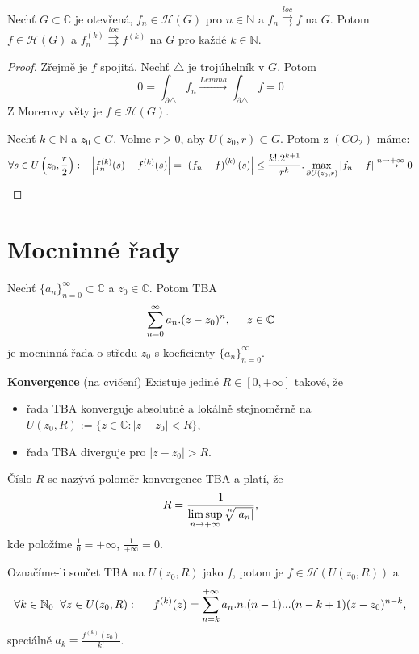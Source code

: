 \begin{theorem}[Weierstrass]
Nechť $G\subset{\mathbb{C}}$ je otevřená, $f_n\in\mathcal{H}(G)$ pro $n\in\mathbb{N}$ a $f_n\overset{loc}{\rightrightarrows}f$ na $G$. Potom $f\in\mathcal{H}(G)$ a $f_n^{(k)}\overset{loc}{\rightrightarrows}f^{(k)}$ na $G$ pro každé $k\in\mathbb{N}$.
\end{theorem}

\begin{proof}
 Zřejmě je $f$ spojitá. Nechť $\triangle$ je trojúhelník v $G$. Potom 
\[0=\int_{\partial\triangle}{f_n}\overset{Lemma}{\longrightarrow}
\int_{\partial\triangle}{f}=0\]
Z Morerovy věty je $f\in\mathcal{H}(G)$.

 Nechť $k\in\mathbb{N}$ a $z_0\in{G}$. Volme $r>0$, aby $\overline{U(z_0,r)}\subset{G}$. Potom z $(CO_2)$ máme:
\[\forall{s\in{U\left(z_0,\frac{r}{2}\right)}}:\hspace{3mm}
{\left\lvert{f_n^{(k)}(s)-f^{(k)}(s)}\right\lvert}=
\left\lvert{\left({f_n-f}\right)^{(k)}(s)}\right\lvert\leq
\frac{k!.2^{k+1}}{r^k}.\max_{\partial{U(z_0,r)}}{|f_n-f|}
\overset{n\to+\infty}{\longrightarrow}0\]
\end{proof}

\section{\texorpdfstring{Mocninné řady}{Mocninné rady}}

\begin{definition}
Nechť $\{a_n\}_{n=0}^\infty\subset\mathbb{C}$ a $z_0\in\mathbb{C}$. Potom TBA
\[\sum_{n=0}^\infty{a_n.(z-z_0)^n}, \hspace{5mm} z\in\mathbb{C}\]
je mocninná řada o středu $z_0$ s koeficienty $\{a_n\}_{n=0}^\infty$.
\end{definition}

\begin{properties}
 \textbf{Konvergence} (na cvičení) \newline
Existuje jediné $R\in{[0,+\infty]}$ takové, že 
\begin{itemize}
    \item řada TBA konverguje absolutně a lokálně stejnoměrně na  $U(z_0,R):=\{z\in\mathbb{C} : |z-z_0|<R\}$, 
    \item řada TBA diverguje pro $|z-z_0|>R$. 
\end{itemize}
Číslo $R$ se nazývá poloměr konvergence TBA a platí, že
\[R=\frac{1}{
\underset{n\to+\infty}{\limsup}{\sqrt[\leftroot{-3}\uproot{3}n]{|a_n|}}},\]
kde položíme $\frac{1}{0}=+\infty$, $\frac{1}{+\infty}=0$.

 Označíme-li součet TBA na $U(z_0,R)$ jako $f$, potom je $f\in\mathcal{H}(U(z_0,R))$ a 
\[
\forall{k\in\mathbb{N}_0}\hspace{2mm}\forall{z\in{U(z_0,R)}}: \hspace{5mm}
f^{(k)}(z)=
\sum_{n=k}^{+\infty}{a_n.n.(n-1)...(n-k+1)(z-z_0)^{n-k}},\]
speciálně $a_k=\frac{f^{(k)}(z_0)}{k!}$.
\end{properties}

